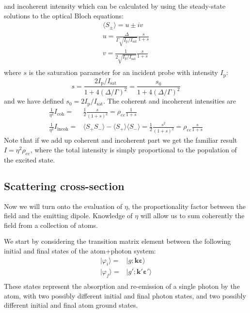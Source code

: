 \documentclass[11pt,letter]{article}
\newcommand{\bv}[1]{\ensuremath{\bm{#1}}}
\newcommand{\iisat}{\ensuremath{I_{\mathrm{p}}/I_{\mathrm{sat}}}}
\begin{document}
and incoherent intensity which can be calculated by using the
steady-state solutions to the optical Bloch equations:
\begin{gather} 
    \langle S_{\pm} \rangle =  u \pm i v  \\
    u =  \frac{ \Delta }{ \Gamma  \sqrt{ I_{\mathrm{p}} / I_{\mathrm{sat}}} } 
         \frac{s}{ 1 + s } \\
    v =  \frac{ 1 } { 2 \sqrt{ I_{\mathrm{p}} / I_{\mathrm{sat}}} } 
         \frac{s}{1+s} \\
\end{gather}
where $s$ is the saturation parameter for an incident probe with intensity
$I_{\mathrm{p}}$:
\begin{equation}
s = \frac{ 2  \iisat } { 1 + 4(\Delta/\Gamma)^{2} } 
  =  \frac{ s_{0} } { 1 + 4(\Delta/\Gamma)^{2} }
\end{equation}
and we have defined $s_{0} = 2 \iisat$. 
The coherent and incoherent intensities are
\begin{equation}
\begin{split} 
    \frac{1}{\eta^{2}}  I_{\mathrm{coh}} = &
        \frac{1}{2} \frac{s}{(1+s)^{2} } 
      = \rho_{ee}  \frac{1}{1+s} \\
    \frac{1}{\eta^{2}}  I_{\mathrm{incoh}}  = & 
        \langle S_{+}S_{-} \rangle - \langle S_{+} \rangle \langle S_{-} \rangle
      = \frac{1}{2} \frac{s^{2}}{(1+s)^{2}} = \rho_{ee} \frac{s}{1+s}
 \label{eq:coh-incoh} 
\end{split}
\end{equation}
Note that if we add up coherent and incoherent part we get the familiar result
$I=\eta^{2} \rho_{ee}$, where the total intensity is simply proportional to the
population of the excited state.


\subsection{Scattering cross-section}

Now we will turn onto the evaluation of $\eta$, the proportionality factor
between the field and the emitting dipole.  Knowledge of $\eta$ will allow us
to sum coherently the field from a collection of atoms. 

We start by considering the  transition matrix element between the following
initial and final states of the atom+photon system: 
\begin{equation}
\begin{split}
    | \varphi_{i} \rangle = & | g ; \bv{k}\bv{\varepsilon} \rangle \\
    | \varphi_{f} \rangle = & | g' ; \bv{k}'\bv{\varepsilon}' \rangle \\
\end{split}
\end{equation}
These states represent the absorption and re-emission of a single photon by the
atom, with two possibly different initial and final photon states, and two
possibly different initial and final atom ground states.
 
\end{document}
